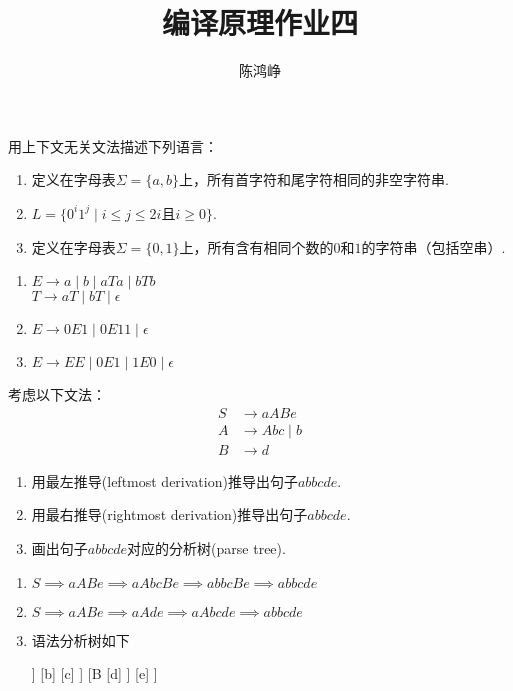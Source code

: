 \documentclass[logo,reportComp]{thesis}
\title{编译原理作业四}
\subtitle{}
\author{陈鸿峥}
\begin{document}
\maketitle

\begin{question}
用上下文无关文法描述下列语言：
\begin{enumerate}
	\item 定义在字母表$\Sigma=\{a, b\}$上，所有首字符和尾字符相同的非空字符串.
	\item $L=\{0^i1^j\mid i\leq j\leq 2i\text{且}i\geq 0\}$.
	\item 定义在字母表$\Sigma=\{0, 1\}$上，所有含有相同个数的$0$和$1$的字符串（包括空串）.
\end{enumerate}
\end{question}
\begin{answer}
\begin{enumerate}
	\item $E\to a\mid b\mid aTa\mid bTb$\\
	$T\to aT\mid bT\mid\epsilon$
	\item $E\to 0E1\mid 0E11\mid\epsilon$
	\item $E\to EE\mid 0E1\mid 1E0\mid\epsilon$
\end{enumerate}
\end{answer}

\begin{question}
考虑以下文法：
\[\begin{aligned}
S&\to aABe\\
A&\to Abc\mid b\\
B&\to d
\end{aligned}\]
\begin{enumerate}
	\item 用最左推导(leftmost derivation)推导出句子$abbcde$.
	\item 用最右推导(rightmost derivation)推导出句子$abbcde$.
	\item 画出句子$abbcde$对应的分析树(parse tree).
\end{enumerate}
\end{question}
\begin{answer}
\begin{enumerate}
	\item $S\implies aABe\implies aAbcBe\implies abbcBe\implies abbcde$
	\item $S\implies aABe\implies aAde\implies aAbcde\implies abbcde$
	\item 语法分析树如下
\begin{center}
\begin{forest}
[S
	[a]
	[A
		[A
			[b]
		]
		[b]
		[c]
	]
	[B
		[d]
	]
	[e]
]
\end{forest}
\end{center}
\end{enumerate}
\end{answer}
\end{document}
